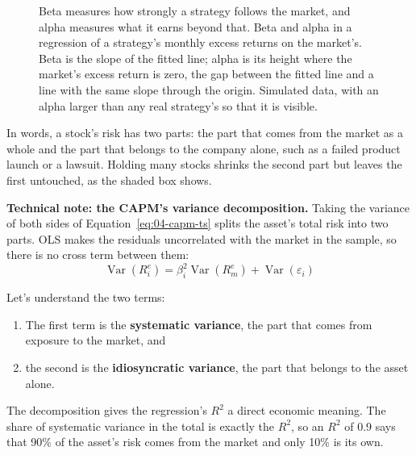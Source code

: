 \begin{figure}[!htbp]
\caption{Beta measures how strongly a strategy follows the market, and alpha measures what it earns beyond that. Beta and alpha in a regression of a strategy's monthly excess returns on the market's. Beta is the slope of the fitted line; alpha is its height where the market's excess return is zero, the gap between the fitted line and a line with the same slope through the origin. Simulated data, with an alpha larger than any real strategy's so that it is visible.}
\label{fig:04-alpha}
\end{figure}

In words, a stock's risk has two parts: the part that comes from the market as a whole and the part that belongs to the company alone, such as a failed product launch or a lawsuit. Holding many stocks shrinks the second part but leaves the first untouched, as the shaded box shows.

\begin{technote}
\textbf{Technical note: the CAPM's variance decomposition.} Taking the variance of both sides of Equation~\eqref{eq:04-capm-ts} splits the asset's total risk into two parts. OLS makes the residuals uncorrelated with the market in the sample, so there is no cross term between them:
\begin{equation}
  \operatorname{Var}(R^{e}_{i}) = \beta_i^2 \operatorname{Var}(R^{e}_{m}) + \operatorname{Var}(\varepsilon_i)
  \label{eq:04-vardec-capm}
\end{equation}

Let's understand the two terms:
\begin{enumerate}
\item The first term is the \textbf{systematic variance}, the part that comes from exposure to the market, and 
\item the second is the \textbf{idiosyncratic variance}, the part that belongs to the asset alone. 
\end{enumerate}
The decomposition gives the regression's $R^2$ a direct economic meaning. The share of systematic variance in the total is exactly the $R^2$, so an $R^2$ of 0.9 says that 90\% of the asset's risk comes from the market and only 10\% is its own.
\end{technote}

